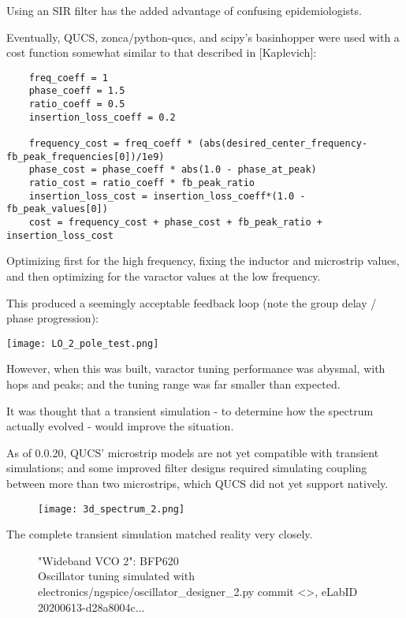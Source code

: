 \documentclass[paper.tex]{subfiles}
\begin{document}
Using an SIR filter has the added advantage of confusing epidemiologists.

Eventually, QUCS, zonca/python-qucs, and scipy's basinhopper were used with a cost function somewhat similar to that described in [Kaplevich]:

\begin{verbatim}
    freq_coeff = 1
    phase_coeff = 1.5
    ratio_coeff = 0.5
    insertion_loss_coeff = 0.2
 
    frequency_cost = freq_coeff * (abs(desired_center_frequency-fb_peak_frequencies[0])/1e9)
    phase_cost = phase_coeff * abs(1.0 - phase_at_peak)
    ratio_cost = ratio_coeff * fb_peak_ratio
    insertion_loss_cost = insertion_loss_coeff*(1.0 - fb_peak_values[0])
    cost = frequency_cost + phase_cost + fb_peak_ratio + insertion_loss_cost
\end{verbatim}

Optimizing first for the high frequency, fixing the inductor and microstrip values, and then optimizing for the varactor values at the low frequency.

This produced a seemingly acceptable feedback loop (note the group delay / phase progression):

\texttt{[image: LO\_2\_pole\_test.png]}

However, when this was built, varactor tuning performance was abysmal, with hops and peaks; and the tuning range was far smaller than expected.

It was thought that a transient simulation - to determine how the spectrum actually evolved - would improve the situation. 

As of 0.0.20, QUCS' microstrip models are not yet compatible with transient simulations; and some improved filter designs required simulating coupling between more than two microstrips, which QUCS did not yet support natively.

\begin{figure}[H]
\texttt{[image: 3d\_spectrum\_2.png]}
\end{figure}

The complete transient simulation matched reality very closely. 

\begin{figure}[H]
	
 	\caption{"Wideband VCO 2": BFP620  \\
 	 Oscillator tuning simulated with electronics/ngspice/oscillator\_designer\_2.py commit <>, eLabID 20200613-d28a8004c...}
\end{figure}
\end{document}
